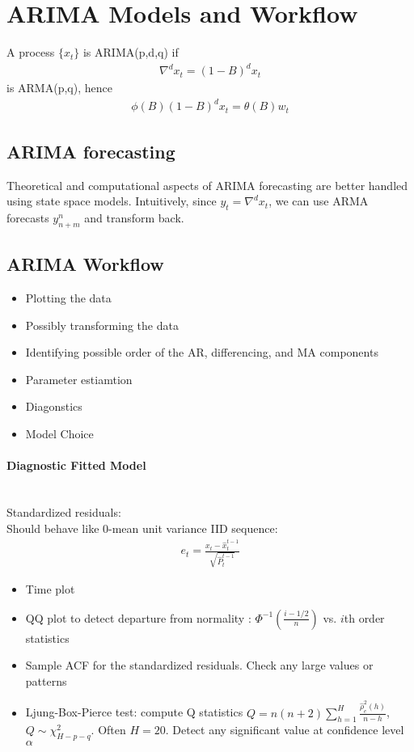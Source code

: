 \section{ARIMA Models and Workflow}
A process $\{ x_t \}$ is ARIMA(p,d,q) if 
    \begin{align*}
        \nabla^d x_t = (1-B)^d x_t
    \end{align*}
is ARMA(p,q), hence 
    \begin{align*}
        \phi(B) (1-B)^d x_t = \theta(B)w_t
    \end{align*}

\subsection{ARIMA forecasting} 
Theoretical and computational aspects of ARIMA forecasting are better handled using state space models. Intuitively, since $y_t = \nabla^d x_t$, we can use ARMA forecasts $y_{n+m}^n$ and transform back. 

\subsection{ARIMA Workflow} 
    \begin{itemize}
        \item Plotting the data 
        \item Possibly transforming the data 
        \item Identifying possible order of the AR, differencing, and MA components
        \item Parameter estiamtion 
        \item Diagonstics 
        \item Model Choice 
    \end{itemize}
    
\paragraph{Diagnostic Fitted Model} \mbox{}\\
Standardized residuals: \\
Should behave like 0-mean unit variance IID sequence: 
    \begin{align*}
        e_t = \frac{x_t - \hat{x}_t^{t-1}}{\sqrt{\hat{P}_t^{t-1}}}
    \end{align*}
    \begin{itemize}
        \item Time plot 
        \item QQ plot to detect departure from normality : $\Phi^{-1}(\frac{i - 1/2}{n})$ vs. $i$th order statistics
        \item Sample ACF for the standardized residuals. Check any large values or patterns
        \item Ljung-Box-Pierce test: compute Q statistics $Q=n(n+2)\sum_{h=1}^H \frac{\hat{\rho}_e^2(h)}{n-h}$, $ Q\sim \chi^2_{H-p-q}$. Often $H=20$. Detect any significant value at confidence level $\alpha$
    \end{itemize}

